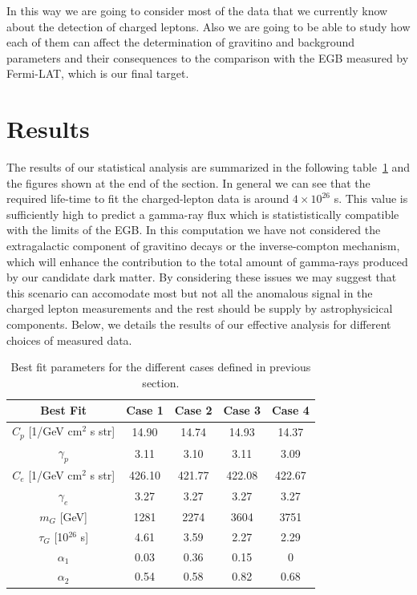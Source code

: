 \documentclass[a4paper,11pt]{article}
\begin{document}
In this way we are going to consider most of the data that we currently know about the detection of charged leptons. Also we are going to be able to study how each of them can affect the determination of gravitino and background parameters and their consequences to the comparison with the EGB measured by Fermi-LAT, which is our final target.

\section{Results}

The results of our statistical analysis are summarized in the following table~\ref{table:best-fit-summary} and the figures shown at the end of the section. In general we can see that the required life-time to fit the charged-lepton data is around $4\times 10^{26}$ s. This value is sufficiently high to predict a gamma-ray flux which is statististically compatible with the limits of the EGB. In this computation we have not considered the extragalactic component of gravitino decays or the inverse-compton mechanism, which will enhance the contribution to the total amount of gamma-rays produced by our candidate dark matter. By considering these issues we may suggest that this scenario can accomodate
most but not all the anomalous signal in the charged lepton measurements and the rest should be supply by astrophysicical components. Below, we details the results of our effective analysis for different choices
of measured data.  

\begin{table}
\centering{}%
\begin{tabular}{|c|c|c|c|c|}
\hline 
 Best Fit & Case 1 & Case 2 & Case 3 & Case 4 \tabularnewline
\hline 
\hline 
$C_p$ [1/GeV cm$^2$ s str] & 14.90 & 14.74 & 14.93 & 14.37 \tabularnewline
\hline 
$\gamma_p$ & 3.11 & 3.10 & 3.11 & 3.09  \tabularnewline
\hline 
$C_e$ [1/GeV cm$^2$ s str] & 426.10 & 421.77 & 422.08 & 422.67 \tabularnewline
\hline 
$\gamma_e$ & 3.27 & 3.27 & 3.27 & 3.27 \tabularnewline
\hline 
$m_G$ [GeV] & 1281 & 2274 & 3604 & 3751 \tabularnewline
\hline 
$\tau_G$ [10$^{26}$ s] & 4.61 & 3.59 & 2.27 & 2.29  \tabularnewline
\hline 
$\alpha_1$  & 0.03 &  0.36 & 0.15 &  0 \tabularnewline
\hline 
$\alpha_2$  & 0.54 &  0.58 & 0.82 & 0.68 \tabularnewline
\hline 
\end{tabular}
\caption{Best fit parameters for the different cases defined in previous section.}
\label{table:best-fit-summary}
\end{table}
\end{document}

